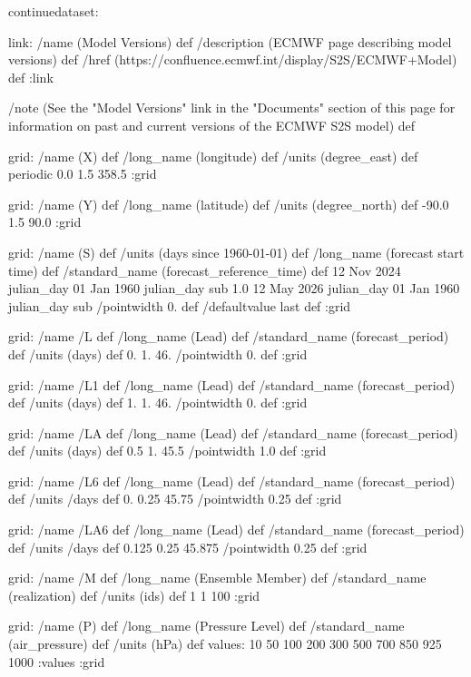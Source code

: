 \begin{ingrid}
continuedataset:

link:
 /name (Model Versions) def
 /description (ECMWF page describing model versions) def
 /href (https://confluence.ecmwf.int/display/S2S/ECMWF+Model) def
:link

/note (See the "Model Versions" link in the "Documents" section of this page for information on past and current versions of the ECMWF S2S model) def

grid:
/name (X) def
/long_name (longitude) def
/units (degree_east) def
periodic
0.0 1.5 358.5
:grid

grid:
/name (Y) def
/long_name (latitude) def
/units (degree_north) def
-90.0 1.5 90.0
:grid

grid:
/name (S) def
/units (days since 1960-01-01) def
/long_name (forecast start time) def
/standard_name (forecast_reference_time) def
12 Nov 2024 julian_day 01 Jan 1960 julian_day sub
1.0
12 May 2026 julian_day 01 Jan 1960 julian_day sub
/pointwidth 0. def
/defaultvalue { last } def
:grid

grid:
/name /L def
/long_name (Lead) def
/standard_name (forecast_period) def
/units (days) def
0. 1. 46.
/pointwidth 0. def
:grid

grid:
/name /L1 def
/long_name (Lead) def
/standard_name (forecast_period) def
/units (days) def
1. 1. 46.
/pointwidth 0. def
:grid

grid:
/name /LA def
/long_name (Lead) def
/standard_name (forecast_period) def
/units (days) def
0.5 1. 45.5
/pointwidth 1.0 def
:grid

grid:
/name /L6 def
/long_name (Lead) def
/standard_name (forecast_period) def
/units /days def
0. 0.25 45.75
/pointwidth 0.25 def
:grid

grid:
/name /LA6 def
/long_name (Lead) def
/standard_name (forecast_period) def
/units /days def
0.125 0.25 45.875
/pointwidth 0.25 def
:grid

grid:
/name /M def
/long_name (Ensemble Member) def
/standard_name (realization) def
/units (ids) def
1 1 100
:grid

grid:
/name (P) def
/long_name (Pressure Level) def
/standard_name (air_pressure) def
/units (hPa) def
values: 10 50 100 200 300 500 700 850 925 1000 :values
:grid


\end{ingrid}
